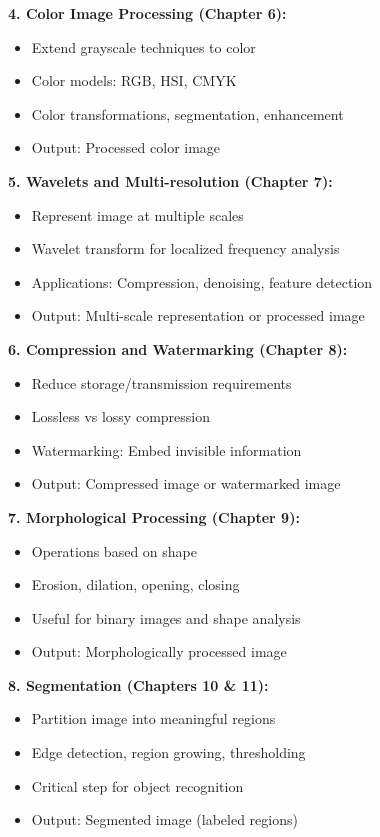 \documentclass[12pt,a4paper]{article}
\begin{document}
\begin{deepexplanation}
\textbf{4. Color Image Processing (Chapter 6):}
\begin{itemize}
    \item Extend grayscale techniques to color
    \item Color models: RGB, HSI, CMYK
    \item Color transformations, segmentation, enhancement
    \item Output: Processed color image
\end{itemize}

\textbf{5. Wavelets and Multi-resolution (Chapter 7):}
\begin{itemize}
    \item Represent image at multiple scales
    \item Wavelet transform for localized frequency analysis
    \item Applications: Compression, denoising, feature detection
    \item Output: Multi-scale representation or processed image
\end{itemize}

\textbf{6. Compression and Watermarking (Chapter 8):}
\begin{itemize}
    \item Reduce storage/transmission requirements
    \item Lossless vs lossy compression
    \item Watermarking: Embed invisible information
    \item Output: Compressed image or watermarked image
\end{itemize}

\textbf{7. Morphological Processing (Chapter 9):}
\begin{itemize}
    \item Operations based on shape
    \item Erosion, dilation, opening, closing
    \item Useful for binary images and shape analysis
    \item Output: Morphologically processed image
\end{itemize}

\textbf{8. Segmentation (Chapters 10 \& 11):}
\begin{itemize}
    \item Partition image into meaningful regions
    \item Edge detection, region growing, thresholding
    \item Critical step for object recognition
    \item Output: Segmented image (labeled regions)
\end{itemize}


\end{deepexplanation}
\end{document}
